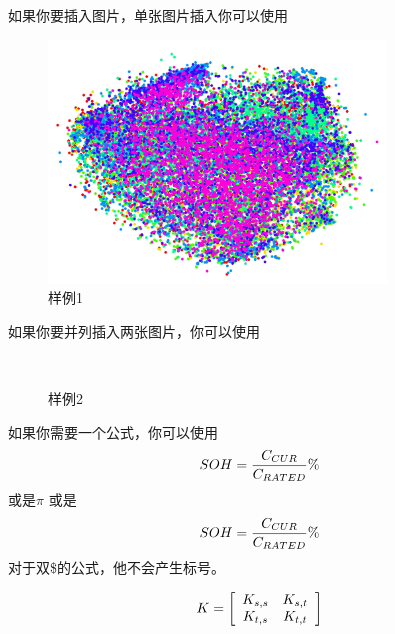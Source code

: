 如果你要插入图片，单张图片插入你可以使用
\begin{figure}[htbp]
    \centering
    \includegraphics[width=0.8\textwidth]{figures/DECAF1.jpg}
    \caption{样例1}
\end{figure}
如果你要并列插入两张图片，你可以使用
\begin{figure}[htbp]
    \centering
    ~~
    \caption{样例2}
    \label{thisiisalabel}
\end{figure}

如果你需要一个公式，你可以使用
\begin{equation}
    SOH=\frac{C_{CUR}}{C_{RATED}}\time 100\%
\end{equation}
或是$\pi$ 或是$$SOH=\frac{C_{CUR}}{C_{RATED}}\time 100\%$$
对于双\$的公式，他不会产生标号。

\begin{equation}
    K=
    \left[
    \begin{array}{c c c}
        K_{s,s} & K_{s,t} \\
        K_{t,s} & K_{t,t} \\
    \end{array}
    \right]
\end{equation}

